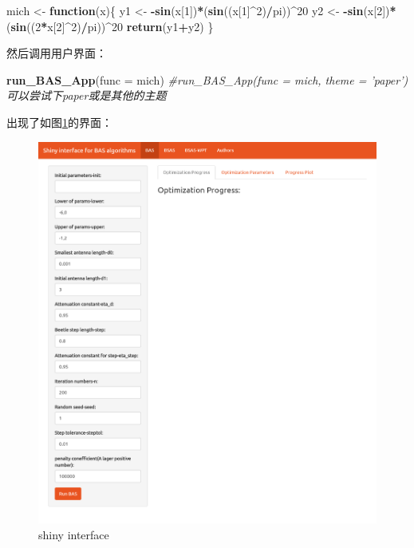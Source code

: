 \documentclass[]{ctexbook}
\newenvironment{Shaded}{\begin{snugshade}}{\end{snugshade}}
\newcommand{\KeywordTok}[1]{\textcolor[rgb]{0.13,0.29,0.53}{\textbf{#1}}}
\newcommand{\DataTypeTok}[1]{\textcolor[rgb]{0.13,0.29,0.53}{#1}}
\newcommand{\DecValTok}[1]{\textcolor[rgb]{0.00,0.00,0.81}{#1}}
\newcommand{\StringTok}[1]{\textcolor[rgb]{0.31,0.60,0.02}{#1}}
\newcommand{\CommentTok}[1]{\textcolor[rgb]{0.56,0.35,0.01}{\textit{#1}}}
\newcommand{\ControlFlowTok}[1]{\textcolor[rgb]{0.13,0.29,0.53}{\textbf{#1}}}
\newcommand{\OperatorTok}[1]{\textcolor[rgb]{0.81,0.36,0.00}{\textbf{#1}}}
\newcommand{\NormalTok}[1]{#1}
\theoremstyle{definition}
\theoremstyle{definition}
\theoremstyle{definition}
\theoremstyle{remark}
\begin{document}
\begin{Shaded}
\begin{Highlighting}[]
\NormalTok{mich <-}\StringTok{ }\ControlFlowTok{function}\NormalTok{(x)\{}
\NormalTok{  y1 <-}\StringTok{ }\OperatorTok{-}\KeywordTok{sin}\NormalTok{(x[}\DecValTok{1}\NormalTok{])}\OperatorTok{*}\NormalTok{(}\KeywordTok{sin}\NormalTok{((x[}\DecValTok{1}\NormalTok{]}\OperatorTok{^}\DecValTok{2}\NormalTok{)}\OperatorTok{/}\NormalTok{pi))}\OperatorTok{^}\DecValTok{20}
\NormalTok{  y2 <-}\StringTok{ }\OperatorTok{-}\KeywordTok{sin}\NormalTok{(x[}\DecValTok{2}\NormalTok{])}\OperatorTok{*}\NormalTok{(}\KeywordTok{sin}\NormalTok{((}\DecValTok{2}\OperatorTok{*}\NormalTok{x[}\DecValTok{2}\NormalTok{]}\OperatorTok{^}\DecValTok{2}\NormalTok{)}\OperatorTok{/}\NormalTok{pi))}\OperatorTok{^}\DecValTok{20}
  \KeywordTok{return}\NormalTok{(y1}\OperatorTok{+}\NormalTok{y2)}
\NormalTok{\}}
\end{Highlighting}
\end{Shaded}

然后调用用户界面：

\begin{Shaded}
\begin{Highlighting}[]
\KeywordTok{run_BAS_App}\NormalTok{(}\DataTypeTok{func =}\NormalTok{ mich)}
\CommentTok{#run_BAS_App(func = mich, theme = 'paper') 可以尝试下paper或是其他的主题}
\end{Highlighting}
\end{Shaded}

出现了如图\ref{fig:basapp}的界面：

\begin{figure}

{\centering \includegraphics[width=0.95\linewidth]{img/app1} 

}

\caption{shiny interface}\label{fig:basapp}
\end{figure}
\end{document}
